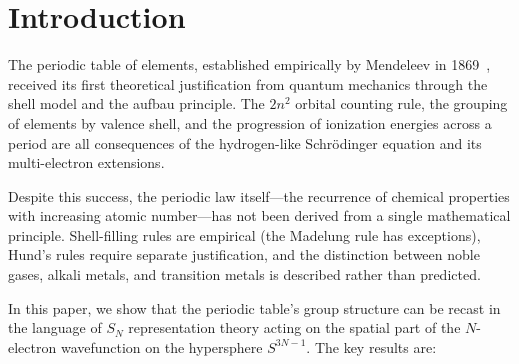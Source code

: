 \documentclass[aps,prl,twocolumn,superscriptaddress,longbibliography]{revtex4-2}
\newcommand{\mufree}{\mu_{\mathrm{free}}}
\begin{document}
\begin{abstract}
recasts the periodic table's group structure in representation-theoretic
language.  The periodic law corresponds to the repetition of the type
sequence $\mathrm{C} \to \mathrm{D} \to \mathrm{E} \to \mathrm{B}$ within
each period.  This classification maps onto, rather than predicts, the
known periodic table structure; its value lies in providing a
unified group-theoretic framework for a pattern that is usually
described empirically.  The angular quantities ($\nu$, $\mufree$) are
integers defined for every $N$, with nothing special at
$Z = 1/\alpha \approx 137$; we read the Dirac instability as a
\emph{metric} rather than a topological effect (an interpretive
observation, not derived here).
\end{abstract}

\maketitle


\section{Introduction}
\label{sec:intro}

The periodic table of elements, established empirically by Mendeleev
in 1869~\cite{Mendeleev1869}, received its first theoretical
justification from quantum mechanics through the shell model and the
aufbau principle.  The $2n^2$ orbital counting rule, the grouping of
elements by valence shell, and the progression of ionization energies
across a period are all consequences of the hydrogen-like
Schr\"odinger equation and its multi-electron extensions.

Despite this success, the periodic law itself---the recurrence of
chemical properties with increasing atomic number---has not been
derived from a single mathematical principle.  Shell-filling rules are
empirical (the Madelung rule has exceptions), Hund's rules require
separate justification, and the distinction between noble gases, alkali
metals, and transition metals is described rather than predicted.

In this paper, we show that the periodic table's group structure
can be recast in the language of $S_N$ representation theory acting
on the spatial part of the $N$-electron wavefunction on the
hypersphere $S^{3N-1}$.  The key results are:
\end{document}
